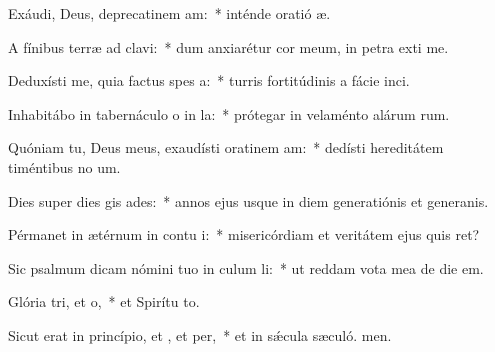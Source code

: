 \item Exáudi, Deus, deprecatinem am:~* inténde oratió æ.
\item A fínibus terræ ad  clavi:~* dum anxiarétur cor meum, in petra exti me.
\item Deduxísti me, quia factus  spes a:~* turris fortitúdinis a fácie inci.
\item Inhabitábo in tabernáculo o in la:~* prótegar in velaménto alárum rum.
\item Quóniam tu, Deus meus, exaudísti oratinem am:~* dedísti hereditátem timéntibus no um.
\item Dies super dies gis ades:~* annos ejus usque in diem generatiónis et generanis.
\item Pérmanet in ætérnum in contu i:~* misericórdiam et veritátem ejus quis ret?
\item Sic psalmum dicam nómini tuo in culum li:~* ut reddam vota mea de die  em.
\item Glória tri, et o,~* et Spirítu to.
\item Sicut erat in princípio, et , et per,~* et in sǽcula sæculó. men.
